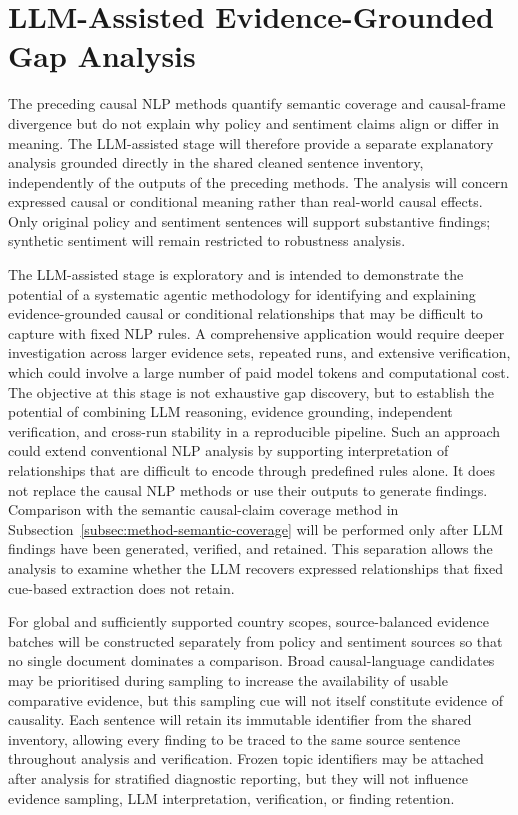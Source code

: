 \section{LLM-Assisted Evidence-Grounded Gap Analysis}
\label{sec:method-llm-gap}


The preceding causal NLP methods quantify semantic coverage and causal-frame
divergence but do not explain why policy and sentiment claims align or differ in
meaning. The LLM-assisted stage will therefore provide a separate explanatory
analysis grounded directly in the shared cleaned sentence inventory, independently of
the outputs of the preceding methods. The analysis will concern expressed causal or
conditional meaning rather than real-world causal effects. Only original policy and
sentiment sentences will support substantive findings; synthetic sentiment will
remain restricted to robustness analysis.

The LLM-assisted stage is exploratory and is intended to demonstrate the potential of
a systematic agentic methodology for identifying and explaining evidence-grounded
causal or conditional relationships that may be difficult to capture with fixed NLP
rules. A comprehensive application would require deeper investigation across larger
evidence sets, repeated runs, and extensive verification, which could involve a large
number of paid model tokens and computational cost. The objective at this stage is
not exhaustive gap discovery, but to establish the potential of combining LLM
reasoning, evidence grounding, independent verification, and cross-run stability in a
reproducible pipeline. Such an approach could extend conventional NLP analysis by
supporting interpretation of relationships that are difficult to encode through
predefined rules alone. It does not replace the causal NLP methods or use their
outputs to generate findings. Comparison with the semantic causal-claim coverage
method in Subsection~\ref{subsec:method-semantic-coverage} will be performed only
after LLM findings have been generated, verified, and retained. This separation
allows the analysis to examine whether the LLM recovers expressed relationships that
fixed cue-based extraction does not retain.

For global and sufficiently supported country scopes, source-balanced evidence
batches will be constructed separately from policy and sentiment sources so that no
single document dominates a comparison. Broad causal-language candidates may be
prioritised during sampling to increase the availability of usable comparative
evidence, but this sampling cue will not itself constitute evidence of causality.
Each sentence will retain its immutable identifier from the shared inventory,
allowing every finding to be traced to the same source sentence throughout analysis
and verification. Frozen topic identifiers may be attached after analysis for
stratified diagnostic reporting, but they will not influence evidence sampling, LLM
interpretation, verification, or finding retention.

